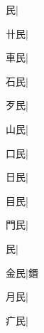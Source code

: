 \begin{multicols}{2}
{{民}\mktsJzrVerticalBar{}{\cjk{}{\cnsym{}　}{\cnsym{}　}{\cnsym{}　}}|{}\par
{\cjk{}{\cnsym{}　}卄民}\mktsJzrVerticalBar{}{\cjk{}{\cnsym{}　}{\cnsym{}　}{\cnsym{}　}}|{}\par
{\cjk{}{\cnsym{}　}車民}\mktsJzrVerticalBar{}{\cjk{}{\cnsym{}　}{\cnsym{}　}{\cnsym{}　}}|{}\par
{\cjk{}{\cnsym{}　}石民}\mktsJzrVerticalBar{}{\cjk{}{\cnsym{}　}{\cnsym{}　}{\cnsym{}　}}|{}\par
{\cjk{}{\cnsym{}　}歹民}\mktsJzrVerticalBar{}{\cjk{}{\cnsym{}　}{\cnsym{}　}{\cnsym{}　}}|{}\par
{\cjk{}{\cnsym{}　}山民}\mktsJzrVerticalBar{}{\cjk{}{\cnsym{}　}{\cnsym{}　}{\cnsym{}　}}|{}\par
{\cjk{}{\cnsym{}　}口民}\mktsJzrVerticalBar{}{\cjk{}{\cnsym{}　}{\cnsym{}　}{\cnsym{}　}}|{}\par
{\cjk{}{\cnsym{}　}日民}\mktsJzrVerticalBar{}{\cjk{}{\cnsym{}　}{\cnsym{}　}{\cnsym{}　}}|{}\par
{\cjk{}{\cnsym{}　}目民}\mktsJzrVerticalBar{}{\cjk{}{\cnsym{}　}{\cnsym{}　}{\cnsym{}　}}|{}\par
{\cjk{}{\cnsym{}　}門民}\mktsJzrVerticalBar{}{\cjk{}{\cnsym{}　}{\cnsym{}　}{\cnsym{}　}}|{}\par
{民}\mktsJzrVerticalBar{}{\cjk{}{\cnsym{}　}{\cnsym{}　}{\cnsym{}　}}|{}\par
{\cjk{}{\cnsym{}　}金民}\mktsJzrVerticalBar{}{\cjk{}{\cnsym{}　}{\cnsym{}　}{\cnsym{}　}}|{\cjk{}鍲}\par
{\cjk{}{\cnsym{}　}月民}\mktsJzrVerticalBar{}{\cjk{}{\cnsym{}　}{\cnsym{}　}{\cnsym{}　}}|{}\par
{\cjk{}{\cnsym{}　}疒民}\mktsJzrVerticalBar{}{\cjk{}{\cnsym{}　}{\cnsym{}　}{\cnsym{}　}}|{}\par
}
\end{multicols}

